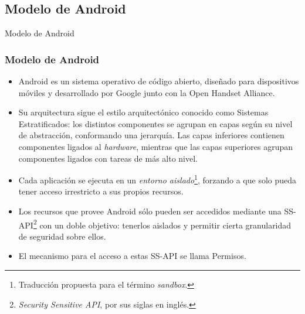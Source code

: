\subsection{Modelo de Android}
\begin{frame}
 \begin{center}
  \LARGE Modelo de Android
 \end{center}
\end{frame}
\begin{frame}
 \frametitle{Modelo de Android}
 \begin{itemize}
  \item Android es un sistema operativo de código abierto, diseñado para dispositivos móviles y desarrollado por Google junto con la Open Handset Alliance.\pause
  \item Su arquitectura sigue el estilo arquitectónico conocido como Sistemas Estratificados: los distintos componentes se agrupan en capas según su nivel de abstracción, conformando una jerarquía. \pause Las capas inferiores contienen componentes ligados al \textit{hardware}, mientras que las capas superiores agrupan componentes ligados con tareas de más alto nivel.\pause
  \item Cada aplicación se ejecuta en un \emph{entorno aislado}\footnote{Traducción propuesta para el término \textit{sandbox}.}, forzando a que solo pueda tener acceso irrestricto a sus propios recursos.
 \end{itemize}
 \begin{itemize}
  \item Los recursos que provee Android sólo pueden ser accedidos mediante una SS-API\footnote{\textit{Security Sensitive API}, por sus siglas en inglés.} con un doble objetivo: \pause tenerlos aislados y permitir cierta granularidad de seguridad sobre ellos.\pause
  \item El mecanismo para el acceso a estas SS-API se llama Permisos.
 \end{itemize}
\end{frame}
